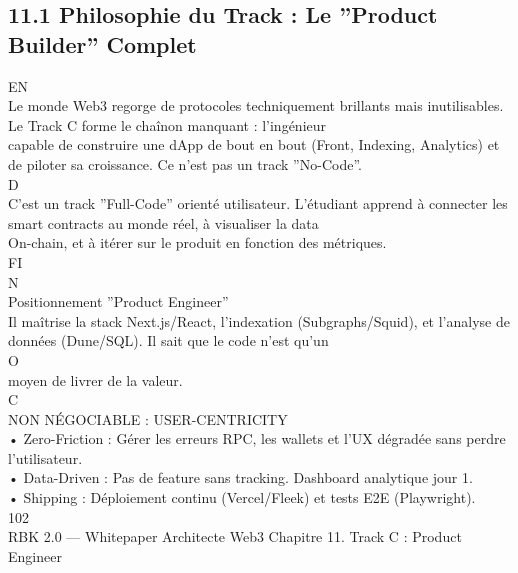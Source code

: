 \documentclass[12pt,landscape,a4paper]{article}
\begin{document}
\subsection{11.1 Philosophie du Track : Le ”Product Builder” Complet}
\vspace{0.5em}
\vspace{0.5em}
\vspace{0.5em}
\vspace{0.5em}
EN\\
Le monde Web3 regorge de protocoles techniquement brillants mais inutilisables. Le Track C forme le chaînon manquant : l’ingénieur\\
capable de construire une dApp de bout en bout (Front, Indexing, Analytics) et de piloter sa croissance. Ce n’est pas un track ”No-Code”.\\
\vspace{0.5em}
\vspace{0.5em}
\vspace{0.5em}
\vspace{0.5em}
D\\
C’est un track ”Full-Code” orienté utilisateur. L’étudiant apprend à connecter les smart contracts au monde réel, à visualiser la data\\
On-chain, et à itérer sur le produit en fonction des métriques.\\
\vspace{0.5em}
\vspace{0.5em}
FI\\
N\\
Positionnement ”Product Engineer”\\
Il maîtrise la stack Next.js/React, l’indexation (Subgraphs/Squid), et l’analyse de données (Dune/SQL). Il sait que le code n’est qu’un\\
O\\
\vspace{0.5em}
moyen de livrer de la valeur.\\
C\\
\vspace{0.5em}
\vspace{0.5em}
NON NÉGOCIABLE : USER-CENTRICITY\\
• Zero-Friction : Gérer les erreurs RPC, les wallets et l’UX dégradée sans perdre l’utilisateur.\\
\vspace{0.5em}
• Data-Driven : Pas de feature sans tracking. Dashboard analytique jour 1.\\
\vspace{0.5em}
• Shipping : Déploiement continu (Vercel/Fleek) et tests E2E (Playwright).\\
\vspace{0.5em}
\vspace{0.5em}
\vspace{0.5em}
102\\
RBK 2.0 — Whitepaper Architecte Web3                                                                Chapitre 11. Track C : Product Engineer\\
\vspace{0.5em}
\vspace{0.5em}
\vspace{0.5em}
\end{document}
